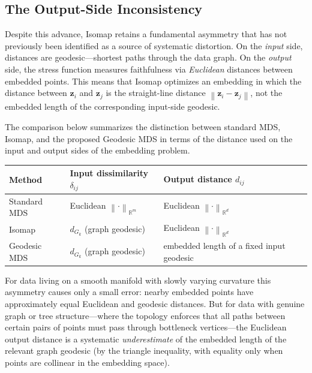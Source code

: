 \documentclass[twoside,11pt]{article}
\newcommand{\R}{\mathbb{R}}
\newcommand{\bz}{\mathbf{z}}
\newcommand{\norm}[1]{\left\|#1\right\|}
\begin{document}
\subsection{The Output-Side Inconsistency}

Despite this advance, Isomap retains a fundamental asymmetry that has not
previously been identified as a source of systematic distortion.  On the
\emph{input} side, distances are geodesic---shortest paths through the data
graph.  On the \emph{output} side, the stress function measures faithfulness
via \emph{Euclidean} distances between embedded points.  This means that
Isomap optimizes an embedding in which the distance between $\bz_i$ and
$\bz_j$ is the straight-line distance $\norm{\bz_i - \bz_j}$, not the
embedded length of the corresponding input-side geodesic.

The comparison below summarizes the distinction between standard MDS,
Isomap, and the proposed Geodesic MDS in terms of the distance used on
the input and output sides of the embedding problem.

\begin{center}
  \small
  \begin{tabular}{@{}p{}p{}p{}@{}}
    \toprule
    Method & Input dissimilarity $\delta_{ij}$ & Output distance $d_{ij}$ \\
    \midrule
    Standard MDS & Euclidean $\norm{\cdot}_{\R^m}$ & Euclidean $\norm{\cdot}_{\R^d}$ \\
    Isomap & $d_{G_k}$ (graph geodesic) & Euclidean $\norm{\cdot}_{\R^d}$ \\
    Geodesic MDS & $d_{G_k}$ (graph geodesic) & embedded length of a fixed input geodesic \\
    \bottomrule
  \end{tabular}
\end{center}

For data living on a smooth manifold with slowly varying curvature this
asymmetry causes only a small error: nearby embedded points have
approximately equal Euclidean and geodesic distances.  But for data with
genuine graph or tree structure---where the topology enforces that all
paths between certain pairs of points must pass through bottleneck
vertices---the Euclidean output distance is a systematic \emph{underestimate}
of the embedded length of the relevant graph geodesic (by the triangle inequality, with
equality only when points are collinear in the embedding space).
\end{document}
